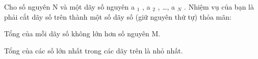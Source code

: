 Cho số nguyên N và một dãy số nguyên a   $_    1   $   , a   $_    2   $   , …, a   $_    N   $   . Nhiệm vụ của bạn là phải cắt dãy số trên thành một số dãy số (giữ nguyên thứ tự) thỏa mãn:  

   Tổng của mỗi dãy số không lớn hơn số nguyên M.  

   Tổng của các số lớn nhất trong các dãy trên là nhỏ nhất.  

\